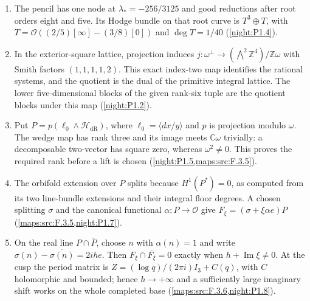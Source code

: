 \documentclass[11pt,a4paper]{article}
\theoremstyle{definition}
\begin{document}
\begin{enumerate}[label=\arabic*.]
\item The pencil has one node at $\lambda_*=-256/3125$ and good
  reductions after root orders eight and five.  Its Hodge bundle on
  that root curve is $T^3\oplus T$, with
  $T=\mathcal O((2/5)[\infty]-(3/8)[0])$ and
  $\deg T=1/40$ (\cref{night:P1.4}).
\item In the exterior-square lattice, projection induces
  $j:\omega^\perp\to(\bigwedge^2\mathbb Z^4)/\mathbb Z\omega$
  with Smith factors $(1,1,1,1,2)$.  This exact index-two map identifies
  the rational systems, and the quotient is the dual of the primitive
  integral lattice.  The lower five-dimensional blocks of the given
  rank-six tuple are the quotient blocks under this map
  (\cref{night:P1.2}).
\item Put $P=p(\ell_0\wedge\mathcal H_{\mathrm{dR}})$, where
  $\ell_0=\langle dx/y\rangle$ and $p$ is projection modulo $\omega$.
  The wedge map has rank three and its image meets $\mathbb C\omega$
  trivially: a decomposable two-vector has square zero, whereas
  $\omega^2\ne0$.  This proves the required rank before a lift is
  chosen (\cref{night:P1.5,maps:src:F.3.5}).
\item The orbifold extension over $P$ splits because
  $H^1(P^*)=0$, as computed from its two line-bundle extensions and
  their integral floor degrees.  A chosen splitting $\sigma$ and
  the canonical functional $\alpha:P\to\mathcal O$ give
  $F_\xi=(\sigma+\xi\alpha e)P$
  (\cref{maps:src:F.3.5,night:P1.7}).
\item On the real line $P\cap\overline P$, choose $n$ with
  $\alpha(n)=1$ and write
  $\sigma(n)-\overline{\sigma(n)}=2ih e$.
  Then $F_\xi\cap\overline{F_\xi}=0$ exactly when
  $h+\operatorname{Im}\xi\ne0$.  At the cusp the period matrix is
  $Z=(\log q)/(2\pi i)I_3+C(q)$, with $C$ holomorphic and bounded;
  hence $h\to+\infty$ and a sufficiently large imaginary shift
  works on the whole completed base
  (\cref{maps:src:F.3.6,night:P1.8}).
\end{enumerate}
\end{document}
